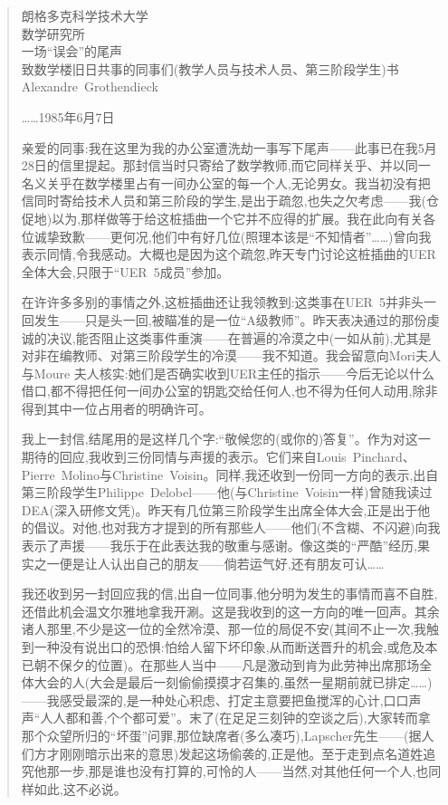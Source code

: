 \begin{quote}
\pmark{}朗格多克科学技术大学\\
数学研究所\\
一场“误会”的尾声\\
致数学楼旧日共事的同事们(教学人员与技术人员、第三阶段学生)书\\
Alexandre~Grothendieck

\hfill ……1985年6月7日

亲爱的同事:我在这里为我的办公室遭洗劫一事写下尾声——此事已在我5月28日的信里提起。那封信当时只寄给了数学教师,而它同样关乎、并以同一名义关乎在数学楼里占有一间办公室的每一个人,无论男女。我当初没有把信同时寄给技术人员和第三阶段的学生,是出于疏忽,也失之欠考虑——我(仓促地)以为,那样做等于给这桩插曲一个它并不应得的扩展。我在此向有关各位诚挚致歉——更何况,他们中有好几位(照理本该是“不知情者”……)曾向我表示同情,令我感动。大概也是因为这个疏忽,昨天专门讨论这桩插曲的UER全体大会,只限于“UER~5成员”参加。

在许许多多别的事情之外,这桩插曲还让我领教到:这类事在UER~5并非头一回发生——只是头一回,被瞄准的是一位“A级教师”。昨天表决通过的那份虔诚的决议,能否阻止这类事件重演——在普遍的冷漠之中(一如从前),尤其是对非在编教师、对第三阶段学生的冷漠——我不知道。我会留意向Mori夫人与Moure 夫人核实:她们是否确实收到UER主任的指示——今后无论以什么借口,都不得把任何一间办公室的钥匙交给任何人,也不得为任何人动用,除非得到其中一位占用者的明确许可。

我上一封信,结尾用的是这样几个字:“敬候您的(或你的)答复”。作为对这一期待的回应,我收到三份同情与声援的表示。它们来自Louis~Pinchard、Pierre~Molino与Christine~Voisin。同样,我还收到一份同一方向的表示,出自第三阶段学生Philippe~Delobel——他(与Christine~Voisin一样)曾随我读过DEA(深入研修文凭)。昨天有几位第三阶段学生出席全体大会,正是出于他的倡议。对他,也对我方才提到的所有那些人——他们(不含糊、不闪避)向我表示了声援——我乐于在此表达我的敬重与感谢。像这类的“严酷”经历,果实之一便是让人认出自己的朋友——倘若运气好,还有朋友可认……

我还收到另一封回应我的信,出自一位同事,他分明为发生的事情而喜不自胜,还借此机会温文尔雅地拿我开涮。这是我收到的这一方向的唯一回声。其余诸人那里,不少是这一位的全然冷漠、那一位的局促不安(其间不止一次,我触到一种没有说出口的恐惧:怕给人留下坏印象,从而断送晋升的机会,或危及本已朝不保夕的位置)。在那些人当中——凡是激动到肯为此劳神出席那场全体大会的人(大会是最后一刻偷偷摸摸才召集的,虽然一星期前就已排定……)——我感受最深的,是一种处心积虑、打定主意要把鱼搅浑的心计,口口声声“人人都和善,个个都可爱”。末了(在足足三刻钟的空谈之后),大家转而拿那个众望所归的“坏蛋”问罪,那位缺席者(多么凑巧),Lapscher先生——(据人们方才刚刚暗示出来的意思)\dmark{}发起这场偷袭的,正是他。至于走到点名道姓追究他那一步,那是谁也没有打算的,可怜的人——当然,对其他任何一个人,也同样如此,这不必说。


\end{quote}
